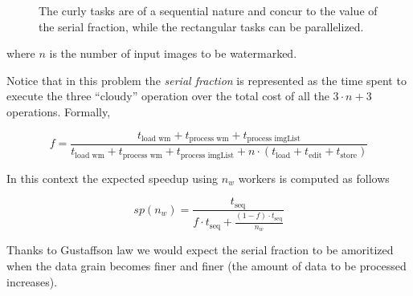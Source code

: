 \documentclass[12pt,a4paper,english]{article}
\begin{document}
\begin{figure}[h]
\begin{center}
  \caption{The curly tasks are of a sequential nature and concur to the value of the serial fraction, while the rectangular tasks can be parallelized.}\label{fig:sequential}
\end{center}
\end{figure}

where $n$ is the number of input images to be watermarked.

Notice that in this problem the \emph{serial fraction} is represented as the time spent to execute the three ``cloudy'' operation over the total cost of all the $3 \cdot n + 3$ operations. Formally,

\[
  f = \frac{t_{\text{load wm}} + t_{\text{process wm}} + t_{\text{process imgList}}}{t_{\text{load wm}} + t_{\text{process wm}} + t_{\text{process imgList}} + n \cdot (t_{\text{load}} + t_{\text{edit}} + t_{\text{store}})}
\]

In this context the expected speedup using $n_w$ workers is computed as follows

\[
  sp(n_w) = \frac{t_{\text{seq}}}{f \cdot t_{\text{seq}} + \frac{(1-f) \cdot t_{\text{seq}}}{n_w}}
\]

Thanks to Gustaffson law we would expect the serial fraction to be amoritized when the data grain becomes finer and finer (the amount of data to be processed increases).
\end{document}
